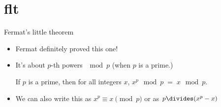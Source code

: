 \documentclass[handout,landscape]{beamer}
\begin{document}
{ %
\begin{frame}[plain]
\rule{0pt}{0pt}
\end{frame} 
} %

\section{flt}

\begin{frame}{Fermat's little theorem}
\begin{itemize}
\item Fermat definitely proved this one! \pause
\item It's about $p$-th powers $\mod p$ (when $p$ is a prime.) \pause 

\begin{thm*}
If $p$ is a prime, then for all integers $x$, $x^p \mod p \; = \; x \mod p$.
\end{thm*}

\pause

\item We can also write this as $x^p \equiv x \pmod{p}$ or as $p \divides (x^p - x)$
\end{itemize}

\end{frame}
\end{document}
